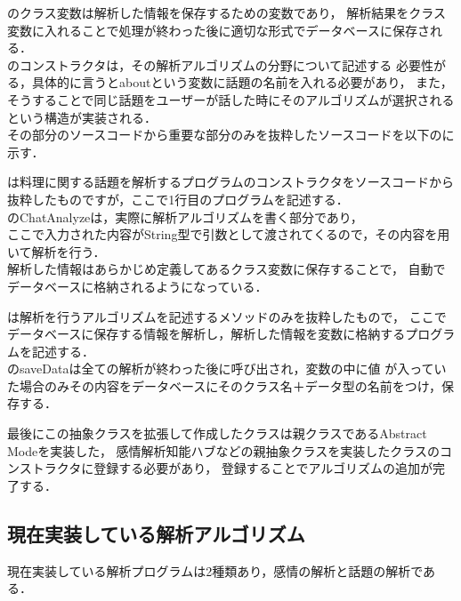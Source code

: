 のクラス変数は解析した情報を保存するための変数であり，
解析結果をクラス変数に入れることで処理が終わった後に適切な形式でデータベースに保存される．
\\

のコンストラクタは，その解析アルゴリズムの分野について記述する
必要性がる，具体的に言うとaboutという変数に話題の名前を入れる必要があり，
また，そうすることで同じ話題をユーザーが話した時にそのアルゴリズムが選択されるという構造が実装される．
\\
その部分のソースコードから重要な部分のみを抜粋したソースコードを以下のに示す．


は料理に関する話題を解析するプログラムのコンストラクタをソースコードから
抜粋したものですが，ここで1行目のプログラムを記述する．
\\

のChatAnalyzeは，実際に解析アルゴリズムを書く部分であり，\\
ここで入力された内容がString型で引数として渡されてくるので，その内容を用いて解析を行う．\\
解析した情報はあらかじめ定義してあるクラス変数に保存することで，
自動でデータベースに格納されるようになっている．


は解析を行うアルゴリズムを記述するメソッドのみを抜粋したもので，
ここでデータベースに保存する情報を解析し，解析した情報を変数に格納するプログラムを記述する．
\\

のsaveDataは全ての解析が終わった後に呼び出され，変数の中に値
が入っていた場合のみその内容をデータベースにそのクラス名＋データ型の名前をつけ，保存する．

最後にこの抽象クラスを拡張して作成したクラスは親クラスであるAbstract Modeを実装した，
感情解析知能ハブなどの親抽象クラスを実装したクラスのコンストラクタに登録する必要があり，
登録することでアルゴリズムの追加が完了する．\\

\subsection{現在実装している解析アルゴリズム}
現在実装している解析プログラムは2種類あり，感情の解析と話題の解析である．
\\

